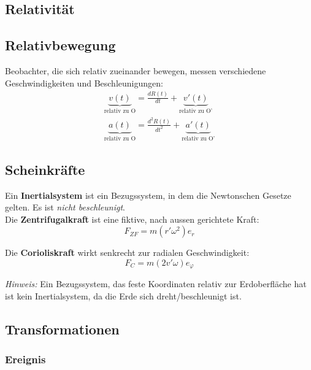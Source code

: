 \documentclass[7pt]{article}
\begin{document}
\begin{multicols*}{3}

\section{Relativität}

\subsection{Relativbewegung}

Beobachter, die sich relativ zueinander bewegen, messen verschiedene Geschwindigkeiten und Beschleunigungen:
\begin{equation*}
\begin{array}{ll}
	\underbrace{v(t)}_\text{relativ zu O} = \frac{dR(t)}{dt} + \underbrace{v'(t)}_\text{relativ zu O'} \\
	\underbrace{a(t)}_\text{relativ zu O} = \frac{d^2R(t)}{dt^2} + \underbrace{a'(t)}_\text{relativ zu O'}
\end{array}
\end{equation*}

\subsection{Scheinkräfte}

Ein \textbf{Inertialsystem} ist ein Bezugssystem, in dem die Newtonschen Gesetze gelten. Es ist \emph{nicht beschleunigt}. \\

Die \textbf{Zentrifugalkraft} ist eine fiktive, nach aussen gerichtete Kraft:
\begin{equation*}
	F_{ZF} = m(r'\omega^2)e_r
\end{equation*}

Die \textbf{Corioliskraft} wirkt senkrecht zur radialen Geschwindigkeit:
\begin{equation*}
	F_C = m(2v'\omega)e_\varphi
\end{equation*}

\emph{Hinweis:} Ein Bezugssystem, das feste Koordinaten relativ zur Erdoberfläche hat ist kein Inertialsystem, da die Erde sich dreht/beschleunigt ist.

\subsection{Transformationen}

\subsubsection{Ereignis}


\end{multicols*}
\end{document}
